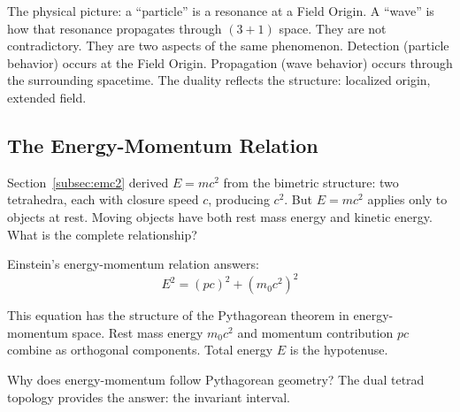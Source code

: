 \documentclass[aps,prd,preprint,superscriptaddress,showpacs,preprintnumbers,amsmath,amssymb,nofootinbib]{revtex4-2}
\begin{document}
The physical picture: a ``particle'' is a resonance at a Field Origin. A ``wave'' is how that resonance propagates through $(3+1)$ space. They are not contradictory. They are two aspects of the same phenomenon. Detection (particle behavior) occurs at the Field Origin. Propagation (wave behavior) occurs through the surrounding spacetime. The duality reflects the structure: localized origin, extended field.

\subsection{The Energy-Momentum Relation}
\label{subsec:energy-momentum}

Section~\ref{subsec:emc2} derived $E = mc^2$ from the bimetric structure: two tetrahedra, each with closure speed $c$, producing $c^2$. But $E = mc^2$ applies only to objects at rest. Moving objects have both rest mass energy and kinetic energy. What is the complete relationship?

Einstein's energy-momentum relation answers:
\begin{equation}
E^2 = (pc)^2 + (m_0 c^2)^2
\end{equation}

This equation has the structure of the Pythagorean theorem in energy-momentum space. Rest mass energy $m_0 c^2$ and momentum contribution $pc$ combine as orthogonal components. Total energy $E$ is the hypotenuse.

Why does energy-momentum follow Pythagorean geometry? The dual tetrad topology provides the answer: the invariant interval.

\vspace{1em}
\noindent
{}
\vspace{1cm}
\end{document}
